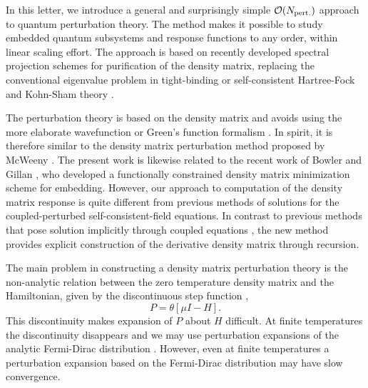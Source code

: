 In this letter, we introduce a general and surprisingly simple 
${\cal O}(N_{\rm pert.})$ approach to quantum perturbation theory.
The method makes it possible to study embedded quantum subsystems
and response functions to any order, within linear scaling effort.
The approach is based on recently developed spectral projection schemes
for purification of the density matrix, replacing the conventional
eigenvalue problem in tight-binding or self-consistent Hartree-Fock 
and Kohn-Sham theory
\cite{McWeeny60,Clinton69,Palser98,Holas01,NiklassonWLT,NiklassonSP2,NiklassonSP4,NiklassonIP}.

The perturbation theory is based on the density matrix and avoids using the more 
elaborate wavefunction or Green's function formalism \cite{Haydock80,Inglesfield81}.
In spirit, it is therefore similar to the density matrix perturbation method
proposed by McWeeny \cite{McWeeny_PRT}. The present work 
is likewise related to the recent work of Bowler and Gillan \cite{Bowler02},
who developed a functionally constrained density matrix minimization scheme for embedding.
However, our approach to computation of the density matrix response is quite different from 
previous methods of solutions for the coupled-perturbed self-consistent-field equations.  
In contrast to previous methods that pose solution implicitly through coupled equations 
\cite{Frisch,Dupuis,Ochsenfeld,Larsen}, the new method provides explicit construction of the 
derivative density matrix through recursion.  

The main problem in constructing a density matrix perturbation theory is 
the non-analytic relation between the zero temperature density matrix and 
the Hamiltonian, given by the discontinuous step function \cite{Notation},
\begin{equation} \label{DM}
P = \theta[\mu I -  H].
\end{equation}
This discontinuity makes expansion of $P$ about $H$ difficult.
At finite temperatures the discontinuity disappears and we may use perturbation 
expansions of the analytic Fermi-Dirac distribution \cite{Feynman}. 
However, even at finite temperatures a perturbation expansion based
on the Fermi-Dirac distribution may have slow convergence.

